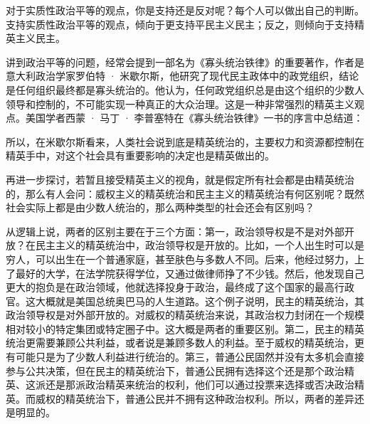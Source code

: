 
对于实质性政治平等的观点，你是支持还是反对呢？每个人可以做出自己的判断。支持实质性政治平等的观点，倾向于更支持平民主义民主；反之，则倾向于支持精英主义民主。

讲到政治平等的问题，经常会提到一部名为《寡头统治铁律》的重要著作，作者是意大利政治学家罗伯特 · 米歇尔斯，他研究了现代民主政体中的政党组织，结论是任何组织最终都是寡头统治的。他认为，任何政党组织总是由这个组织的少数人领导和控制的，不可能实现一种真正的大众治理。这是一种非常强烈的精英主义观点。美国学者西蒙 · 马丁 · 李普塞特在《寡头统治铁律》一书的序言中总结道：


所以，在米歇尔斯看来，人类社会说到底是精英统治的，主要权力和资源都控制在精英手中，对这个社会具有重要影响的决定也是精英做出的。

再进一步探讨，若暂且接受精英主义的视角，就是假定所有社会都是由精英统治的，那么有人会问：威权主义的精英统治和民主主义的精英统治有何区别呢？既然社会实际上都是由少数人统治的，那么两种类型的社会还会有区别吗？

从逻辑上说，两者的区别主要在于三个方面：第一，政治领导权是不是对外部开放？在民主主义的精英统治中，政治领导权是开放的。比如，一个人出生时可以是穷人，可以出生在一个普通家庭，甚至肤色与多数人不同。后来，他经过努力，上了最好的大学，在法学院获得学位，又通过做律师挣了不少钱。然后，他发现自己更大的抱负是在政治领域，他就选择投身于政治，最终成了这个国家的最高行政官。这大概就是美国总统奥巴马的人生道路。这个例子说明，民主的精英统治，其政治领导权是对外部开放的。对威权的精英统治来说，其政治权力封闭在一个规模相对较小的特定集团或特定圈子中。这大概是两者的重要区别。第二，民主的精英统治更需要兼顾公共利益，或者说是兼顾多数人的利益。至于威权的精英统治，更有可能只是为了少数人利益进行统治的。第三，普通公民固然并没有太多机会直接参与公共决策，但在民主的精英统治下，普通公民拥有选择这个还是那个政治精英、这派还是那派政治精英来统治的权利，他们可以通过投票来选择或否决政治精英。而威权的精英统治下，普通公民并不拥有这种政治权利。所以，两者的差异还是明显的。

